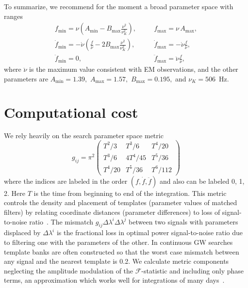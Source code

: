 \documentclass{ttuthes2007}
\begin{document}
To summarize, we recommend for the moment a broad parameter space with ranges
\begin{eqnarray}
\label{range0}
f_{\min} = \nu \left( A_{\min} - B_{\max} \frac{\nu^2} {\nu_K^2} \right),
&\quad&
f_{\max} = \nu\, A_{\max},
\\
\label{range1}
\dot f_{\min} = -\dot\nu \left( \frac{f}{\nu} - 2B_{\max} \frac{\nu^2}
{\nu_K^2} \right),
&\quad&
\dot f_{\max} = -\dot\nu \frac{f}{\nu},
\\
\label{range2}
\ddot f_{\min} = 0,
&\quad&
\ddot f_{\max} = \ddot\nu \frac{f}{\nu},
\end{eqnarray}
where $\ddot\nu$ is the maximum value consistent with \ac{EM} observations,
and the other parameters are $A_{\min} = 1.39,$ $A_{\max} = 1.57,$ $B_{\max} =
0.195,$ and $\nu_K = 506$~Hz.

\section{Computational cost}

We rely heavily on the search parameter space metric~\cite{Wette:2008hg}
\begin{equation}
g_{ij} = \pi^2 \left(
\begin{array}{ccc}
T^2/3 & T^3/6 & T^4/20 \\
T^3/6 & 4T^4/45 & T^5/36 \\
T^4/20 & T^5/36 & T^6/112
\end{array}
\right)
\end{equation}
where the indices are labeled in the order $(f, \dot f, \ddot f)$ and also can
be labeled 0, 1, 2.
Here $T$ is the time from beginning to end of the integration.
This metric controls the density and placement of templates (parameter values
of matched filters) by relating coordinate distances (parameter differences)
to loss of signal-to-noise ratio~\cite{Owen_1996}.
The mismatch $g_{ij} \Delta \lambda^i \Delta \lambda^j$ between two signals
with parameters displaced by $\Delta \lambda^i$ is the fractional loss in
optimal power signal-to-noise ratio due to filtering one with the parameters
of the other.
In continuous \ac{GW} searches template banks are often constructed so that
the worst case mismatch between any signal and the nearest template is 0.2.
We calculate metric components neglecting the amplitude modulation of the
$\mathcal{F}$-statistic and including only phase terms, an approximation which
works well for integrations of many days~\cite{Prix:2006wm}.
\end{document}
